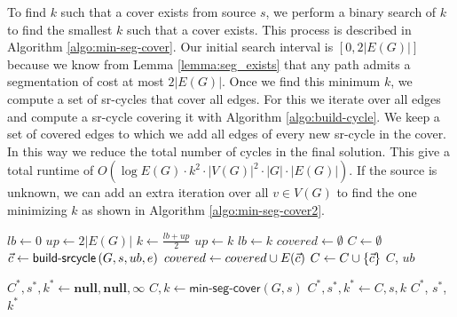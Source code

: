 To find $k$ such that a cover exists from source $s$, we perform a binary search of $k$ to find the smallest $k$ such that a cover exists. This process is described
in Algorithm \ref{algo:min-seg-cover}. Our initial search interval is $[0, 2|E(G)|]$ because we know from Lemma \ref{lemma:seg_exists}
 that any path admits a segmentation of cost at most $2 |E(G)|$.
Once we find this minimum $k$, we compute a set of sr-cycles that cover all edges. For this we iterate over all edges and compute a sr-cycle covering it with Algorithm \ref{algo:build-cycle}.
We keep a set of covered edges to which we add all edges of every new sr-cycle in the cover. In this way we reduce the total number of cycles in the final solution.
This give a total runtime of $O(\log E(G) \cdot k^2 \cdot |V(G)|^2 \cdot |G| \cdot |E(G)|)$. If the source is unknown, we can add an extra iteration over all $v \in V(G)$ to find the one 
minimizing $k$ as shown in Algorithm \ref{algo:min-seg-cover2}.


\begin{algorithm}[t]
\small
\caption{$\textsf{min-seg-cover}\left( G, s \right)$}
\begin{algorithmic}[1]
{}
\STATE $lb \gets 0$
\STATE $up \gets 2|E(G)|$
  \STATE $k \gets \frac{lb + up}{2}$
    \STATE $up \gets k$
  \ELSE
    \STATE $lb \gets k$
  \ENDIF
\ENDWHILE
{}
\STATE $covered \gets \emptyset$
\STATE $C \gets \emptyset$
    \STATE $\vec{c} \gets \textsf{build-srcycle}\left( G, s, ub, e \right)$
    \STATE $covered \gets covered \cup E(\vec{c})$
    \STATE $C \gets C \cup \{ \vec{c} \}$
  \ENDIF
\ENDFOR
\RETURN $C$, $ub$
\end{algorithmic}
\label{algo:min-seg-cover}
\end{algorithm}


\begin{algorithm}[t]
\small
\caption{$\textsf{min-seg-cover}\left( G \right)$}
\begin{algorithmic}[1]
\STATE $C^*, s^*, k^* \gets \textbf{null}, \textbf{null}, \infty$
  \STATE $C, k \gets \textsf{min-seg-cover}\left( G, s \right)$
    \STATE $C^*, s^*, k^* \gets C, s, k$
  \ENDIF
\ENDFOR
\RETURN $C^*$, $s^*$, $k^*$
\end{algorithmic}
\label{algo:min-seg-cover2}
\end{algorithm}


